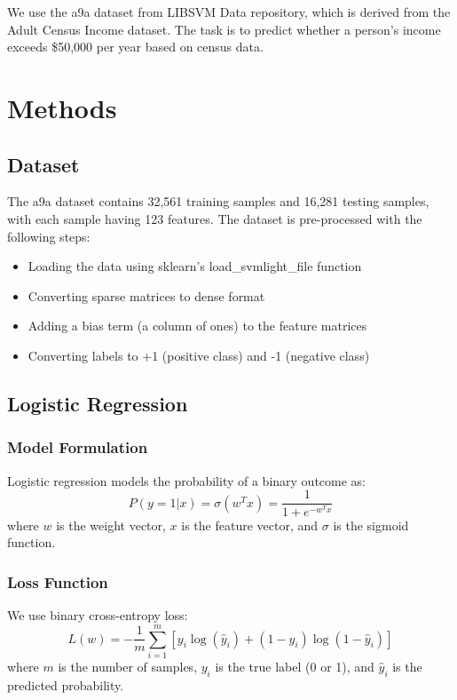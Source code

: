 \documentclass[journal, a4paper]{IEEEtran}
\begin{document}
We use the a9a dataset from LIBSVM Data repository, which is derived from the Adult Census Income dataset. The task is to predict whether a person's income exceeds \$50,000 per year based on census data.

\section{Methods}
\subsection{Dataset}
The a9a dataset contains 32,561 training samples and 16,281 testing samples, with each sample having 123 features. The dataset is pre-processed with the following steps:

\begin{itemize}
    \item Loading the data using sklearn's load\_svmlight\_file function
    \item Converting sparse matrices to dense format
    \item Adding a bias term (a column of ones) to the feature matrices
    \item Converting labels to +1 (positive class) and -1 (negative class)
\end{itemize}

\subsection{Logistic Regression}
\subsubsection{Model Formulation}
Logistic regression models the probability of a binary outcome as:
\begin{equation}
P(y=1|x) = \sigma(w^T x) = \frac{1}{1 + e^{-w^T x}}
\end{equation}
where $w$ is the weight vector, $x$ is the feature vector, and $\sigma$ is the sigmoid function.

\subsubsection{Loss Function}
We use binary cross-entropy loss:
\begin{equation}
L(w) = -\frac{1}{m}\sum_{i=1}^{m}[y_i\log(\hat{y}_i) + (1-y_i)\log(1-\hat{y}_i)]
\end{equation}
where $m$ is the number of samples, $y_i$ is the true label (0 or 1), and $\hat{y}_i$ is the predicted probability.
\end{document}
